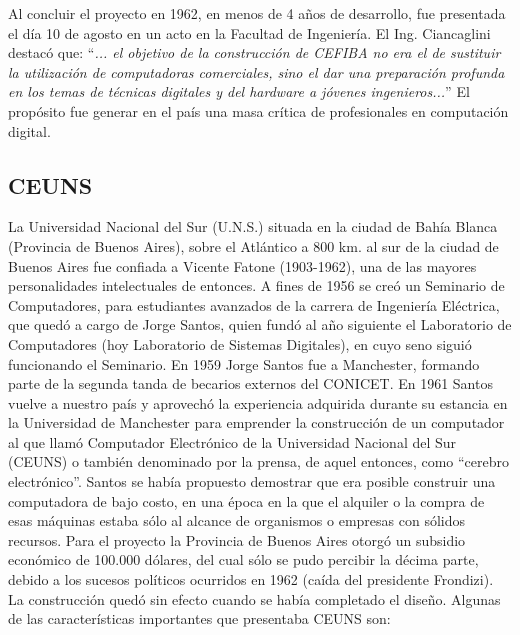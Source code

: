 \documentclass[%
 	final,
%
	notitlepage,
	narroweqnarray,
	inline,
 	twoside,
	]{ieee}
\begin{document}
Al concluir el proyecto en 1962, en menos de 4 a\~nos de desarrollo, fue presentada el d\'ia 10 de agosto en un acto en la Facultad de Ingenier\'ia. El Ing. Ciancaglini destac\'o que: ``\textit{... el objetivo de la construcci\'on de CEFIBA no era el de sustituir la utilizaci\'on de computadoras comerciales, sino el dar una preparaci\'on profunda en los temas de t\'ecnicas digitales y del hardware a j\'ovenes ingenieros...}'' El prop\'osito fue generar en el pa\'is una masa cr\'itica de profesionales en computaci\'on digital.


\subsection*{CEUNS}
La Universidad Nacional del Sur (U.N.S.) situada en la ciudad de Bah\'ia Blanca (Provincia de Buenos Aires), sobre el Atl\'antico a 800 km. al sur de la ciudad de Buenos Aires fue confiada a Vicente Fatone (1903-1962), una de las mayores personalidades intelectuales de entonces. A fines de 1956 se cre\'o un Seminario de Computadores, para estudiantes avanzados de la carrera de Ingenier\'ia El\'ectrica, que qued\'o a cargo de Jorge Santos, quien fund\'o al a\~no siguiente el Laboratorio de Computadores (hoy Laboratorio de Sistemas Digitales), en cuyo seno sigui\'o funcionando el Seminario.
En 1959 Jorge Santos fue a Manchester, formando parte de la segunda tanda de becarios externos del CONICET. En 1961 Santos vuelve a nuestro pa\'is y aprovech\'o la experiencia adquirida durante su estancia en la Universidad de Manchester para emprender la construcci\'on de un computador al que llam\'o Computador Electr\'onico de la Universidad Nacional del Sur (CEUNS) o tambi\'en denominado por la prensa, de aquel entonces, como ``cerebro electr\'onico''. Santos se hab\'ia propuesto demostrar que era posible construir una  computadora de bajo costo, en una \'epoca en la que el alquiler o la compra de esas m\'aquinas estaba s\'olo al alcance de organismos o empresas con s\'olidos recursos. Para el proyecto la Provincia de Buenos Aires otorg\'o un subsidio econ\'omico de  100.000 d\'olares, del cual s\'olo se pudo percibir la d\'ecima parte, debido a los sucesos pol\'iticos ocurridos en 1962 (ca\'ida del presidente Frondizi). La construcci\'on qued\'o sin efecto cuando se hab\'ia completado el dise\~no.
Algunas de las caracter\'isticas importantes que presentaba CEUNS son:\\
\end{document}
